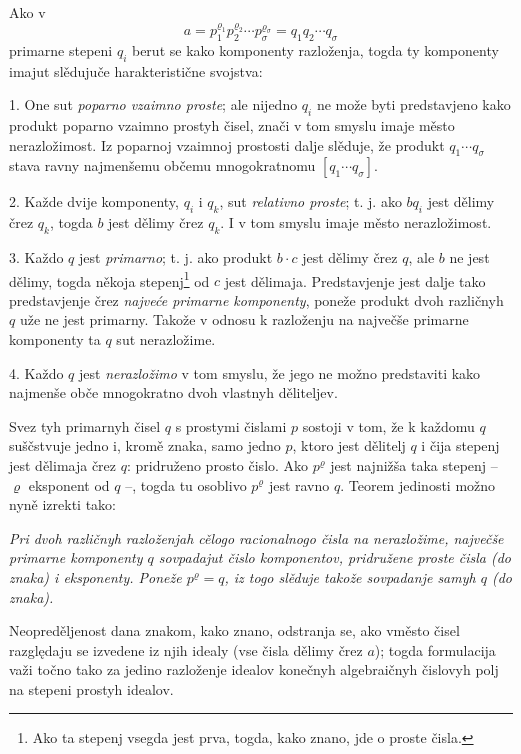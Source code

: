 \documentclass[11pt]{article}
\begin{document}
Ako v
\[
 a=p_1^{\varrho_1}p_2^{\varrho_2}\cdots p_\sigma^{\varrho_\sigma}=q_1q_2\cdots q_\sigma
\]
primarne stepeni \(q_i\) berut se kako komponenty razloženja, togda ty komponenty imajut slědujuče harakteristične svojstva:

1. One sut \emph{poparno vzaimno proste}; ale nijedno \(q_i\) ne može byti predstavjeno kako produkt poparno vzaimno prostyh čisel, znači v tom smyslu imaje město nerazložimost. Iz poparnoj vzaimnoj prostosti dalje slěduje, že produkt \(q_1\cdots q_\sigma\) stava ravny najmenšemu občemu mnogokratnomu \([q_1\cdots q_\sigma]\).

2. Každe dvije komponenty, \(q_i\) i \(q_k\), sut \emph{relativno proste}; t. j. ako \(bq_i\) jest dělimy črez \(q_k\), togda \(b\) jest dělimy črez \(q_k\). I v tom smyslu imaje město nerazložimost.

3. Každo \(q\) jest \emph{primarno}; t. j. ako produkt \(b\cdot c\) jest dělimy črez \(q\), ale \(b\) ne jest dělimy, togda někoja stepenj\footnote{Ako ta stepenj vsegda jest prva, togda, kako znano, jde o proste čisla.} od \(c\) jest dělimaja. Predstavjenje jest dalje tako predstavjenje črez \emph{najveće primarne komponenty}, poneže produkt dvoh različnyh \(q\) uže ne jest primarny. Takože v odnosu k razloženju na največše primarne komponenty ta \(q\) sut nerazložime.

4. Každo \(q\) jest \emph{nerazložimo} v tom smyslu, že jego ne možno predstaviti kako najmenše obče mnogokratno dvoh vlastnyh děliteljev.

Svez tyh primarnyh čisel \(q\) s prostymi čislami \(p\) sostoji v tom, že k každomu \(q\) suščstvuje jedno i, kromě znaka, samo jedno \(p\), ktoro jest dělitelj \(q\) i čija stepenj jest dělimaja črez \(q\): pridruženo prosto čislo. Ako \(p^\varrho\) jest najnižša taka stepenj -- \(\varrho\) eksponent od \(q\) --, togda tu osoblivo \(p^\varrho\) jest ravno \(q\). Teorem jedinosti možno nyně izrekti tako:

\emph{Pri dvoh različnyh razloženjah cělogo racionalnogo čisla na nerazložime, največše primarne komponenty \(q\) sovpadajut čislo komponentov, pridružene proste čisla (do znaka) i eksponenty. Poneže \(p^\varrho=q\), iz togo slěduje takože sovpadanje samyh \(q\) (do znaka).}

Neopreděljenost dana znakom, kako znano, odstranja se, ako vměsto čisel razględaju se izvedene iz njih idealy (vse čisla dělimy črez \(a\)); togda formulacija važi točno tako za jedino razloženje idealov konečnyh algebraičnyh čislovyh polj na stepeni prostyh idealov.
\end{document}
